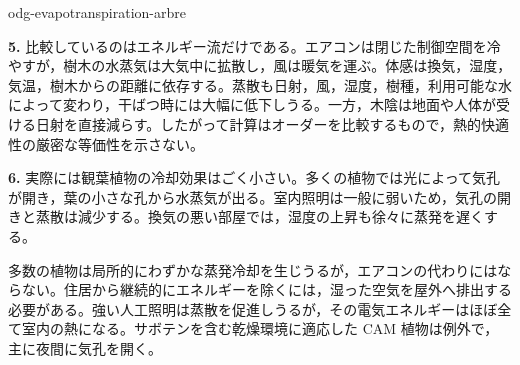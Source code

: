 \begin{exo}{odg-evapotranspiration-arbre}
\begin{solution}
\textbf{5.} 比較しているのはエネルギー流だけである。エアコンは閉じた制御空間を冷やすが，樹木の水蒸気は大気中に拡散し，風は暖気を運ぶ。体感は換気，湿度，気温，樹木からの距離に依存する。蒸散も日射，風，湿度，樹種，利用可能な水によって変わり，干ばつ時には大幅に低下しうる。一方，木陰は地面や人体が受ける日射を直接減らす。したがって計算はオーダーを比較するもので，熱的快適性の厳密な等価性を示さない。

\textbf{6.} 実際には観葉植物の冷却効果はごく小さい。多くの植物では光によって気孔が開き，葉の小さな孔から水蒸気が出る。室内照明は一般に弱いため，気孔の開きと蒸散は減少する。換気の悪い部屋では，湿度の上昇も徐々に蒸発を遅くする。

多数の植物は局所的にわずかな蒸発冷却を生じうるが，エアコンの代わりにはならない。住居から継続的にエネルギーを除くには，湿った空気を屋外へ排出する必要がある。強い人工照明は蒸散を促進しうるが，その電気エネルギーはほぼ全て室内の熱になる。サボテンを含む乾燥環境に適応した CAM 植物は例外で，主に夜間に気孔を開く。
\end{solution}
\end{exo}

